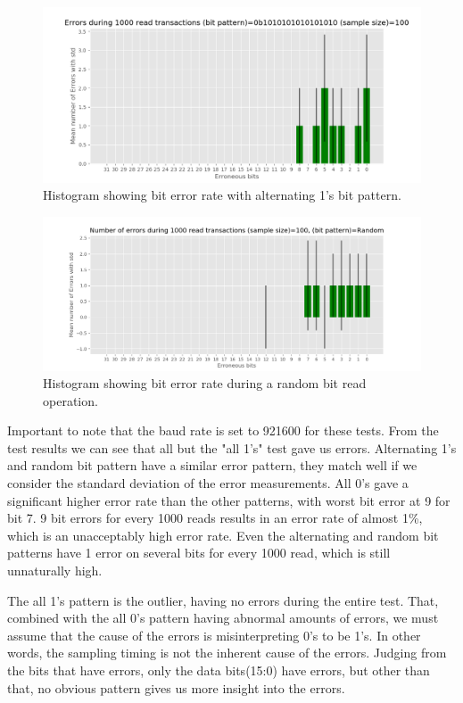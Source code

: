 \documentclass[main.tex]{subfiles}
\begin{document}
\begin{figure}[!ht]
    \centering
    \includegraphics[width=18cm]{images/error_rate_alternating_1s.png}
    \caption{Histogram showing bit error rate with alternating 1's bit pattern.}
    \label{fig: alternating_1_bit_rate}
\end{figure}
\FloatBarrier

\begin{figure}[!ht]
    \centering
    \includegraphics[width=18cm]{images/error_rate_random.png}
    \caption{Histogram showing bit error rate during a random bit read operation.}
    \label{fig: rand_bit_rate}
\end{figure}
\FloatBarrier

Important to note that the baud rate is set to 921600 for these tests. From the test results we can see that all but the "all 1's" test gave us errors. Alternating 1's and random bit pattern have a similar error pattern, they match well if we consider the standard deviation of the error measurements. All 0's gave a significant higher error rate than the other patterns, with worst bit error at 9 for bit 7. 9 bit errors for every 1000 reads results in an error rate of almost 1\%, which is an unacceptably high error rate. Even the alternating and random bit patterns have 1 error on several bits for every 1000 read, which is still unnaturally high.

The all 1's pattern is the outlier, having no errors during the entire test. That, combined with the all 0's pattern having abnormal amounts of errors, we must assume that the cause of the errors is misinterpreting 0's to be 1's. In other words, the sampling timing is not the inherent cause of the errors. Judging from the bits that have errors, only the data bits(15:0) have errors, but other than that, no obvious pattern gives us more insight into the errors.
\end{document}
